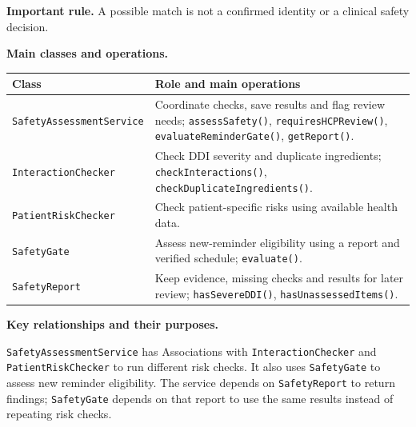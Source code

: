 \noindent\textbf{Important rule.} A possible match is not a confirmed identity
or a clinical safety decision.



\noindent\textbf{Main classes and operations.}\par\smallskip
\begingroup\small
\begin{tabularx}{\textwidth}{|L{0.37\textwidth}|Y|}
\hline
\textbf{Class} & \textbf{Role and main operations} \\ \hline

\texttt{SafetyAssessmentService} &
Coordinate checks, save results and flag review needs;
\texttt{assessSafety()}, \texttt{requiresHCPReview()},
\texttt{evaluateReminderGate()}, \texttt{getReport()}. \\ \hline

\texttt{InteractionChecker} &
Check DDI severity and duplicate ingredients;
\texttt{checkInteractions()},
\texttt{checkDuplicateIngredients()}. \\ \hline

\texttt{PatientRiskChecker} &
Check patient-specific risks using available health data. \\ \hline

\texttt{SafetyGate} &
Assess new-reminder eligibility using a report and verified
schedule; \texttt{evaluate()}. \\ \hline

\texttt{SafetyReport} &
Keep evidence, missing checks and results for later review; \texttt{hasSevereDDI()},
\texttt{hasUnassessedItems()}. \\ \hline

\end{tabularx}
\endgroup

\noindent\textbf{Key relationships and their purposes.}\par\smallskip
\texttt{SafetyAssessmentService} has Associations with
\texttt{InteractionChecker} and \texttt{PatientRiskChecker} to run
different risk checks. It also uses \texttt{SafetyGate} to assess new
reminder eligibility. The service depends on \texttt{SafetyReport} to
return findings; \texttt{SafetyGate} depends on that report to use the
same results instead of repeating risk checks.

